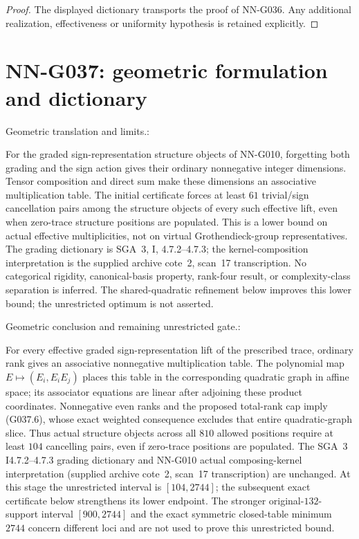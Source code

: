 \begin{proof} The displayed dictionary transports the proof of NN-G036. Any additional realization, effectiveness or uniformity hypothesis is retained explicitly.\end{proof}


\section{NN-G037: geometric formulation and dictionary}
\begin{geometricstatement}[NN-G037]
Geometric translation and limits.:

For the graded sign-representation structure objects of
NN-G010, forgetting both grading and the sign action
gives their ordinary nonnegative integer dimensions.
Tensor composition and direct sum make these dimensions
an associative multiplication table.
The initial certificate forces at least $61$ trivial/sign cancellation pairs
among the structure objects of every such effective lift,
even when zero-trace structure positions are populated.
This is a lower bound on actual effective multiplicities,
not on virtual Grothendieck-group representatives.
The grading dictionary is SGA~3, I, 4.7.2--4.7.3;
the kernel-composition interpretation is the supplied
archive cote~2, scan~17 transcription.
No categorical rigidity, canonical-basis property, rank-four
result, or complexity-class separation is inferred.
The shared-quadratic refinement below improves this lower bound;
the unrestricted optimum is not asserted.


Geometric conclusion and remaining unrestricted gate.:

For every effective graded sign-representation lift of the prescribed
trace, ordinary rank gives an associative nonnegative multiplication
table.  The polynomial map $E\mapsto(E_i,E_iE_j)$ places this table
in the corresponding quadratic graph in affine space; its associator
equations are linear after adjoining these product coordinates.
Nonnegative even ranks and the proposed total-rank cap imply
(G037.6), whose exact weighted consequence excludes that entire
quadratic-graph slice.  Thus actual structure objects across all
$810$ allowed positions require at least $104$ cancelling pairs,
even if zero-trace positions are populated.  The SGA~3 I4.7.2--4.7.3
grading dictionary and NN-G010 actual composing-kernel interpretation
(supplied archive cote~2, scan~17 transcription) are unchanged.
At this stage the unrestricted interval is $[104,2744]$;
the subsequent exact certificate below strengthens its lower endpoint.  The stronger
original-$132$-support interval $[900,2744]$ and the exact symmetric
closed-table minimum $2744$ concern different loci and are not
used to prove this unrestricted bound.



\end{geometricstatement}
